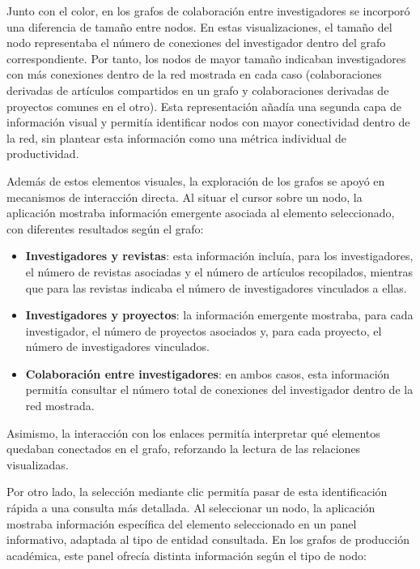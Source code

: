\documentclass[11pt,spanish,listoffigures,listoftables]{tfgetsinf}
\begin{document}
Junto con el color, en los grafos de colaboración entre investigadores se incorporó una diferencia de tamaño entre nodos. En estas visualizaciones, el tamaño del nodo representaba el número de conexiones del investigador dentro del grafo correspondiente. Por tanto, los nodos de mayor tamaño indicaban investigadores con más conexiones dentro de la red mostrada en cada caso (colaboraciones derivadas de artículos compartidos en un grafo y colaboraciones derivadas de proyectos comunes en el otro). Esta representación añadía una segunda capa de información visual y permitía identificar nodos con mayor conectividad dentro de la red, sin plantear esta información como una métrica individual de productividad.

Además de estos elementos visuales, la exploración de los grafos se apoyó en mecanismos de interacción directa. Al situar el cursor sobre un nodo, la aplicación mostraba información emergente asociada al elemento seleccionado, con diferentes resultados según el grafo: 
\begin{itemize}
    \item \textbf{Investigadores y revistas}: esta información incluía, para los investigadores, el número de revistas asociadas y el número de artículos recopilados, mientras que para las revistas indicaba el número de investigadores vinculados a ellas.

    \item \textbf{Investigadores y proyectos}: la información emergente mostraba, para cada investigador, el número de proyectos asociados y, para cada proyecto, el número de investigadores vinculados.

    \item \textbf{Colaboración entre investigadores}: en ambos casos, esta información permitía consultar el número total de conexiones del investigador dentro de la red mostrada.
\end{itemize}

Asimismo, la interacción con los enlaces permitía interpretar qué elementos quedaban conectados en el grafo, reforzando la lectura de las relaciones visualizadas.

Por otro lado, la selección mediante clic permitía pasar de esta identificación rápida a una consulta más detallada. Al seleccionar un nodo, la aplicación mostraba información específica del elemento seleccionado en un panel informativo, adaptada al tipo de entidad consultada. En los grafos de producción académica, este panel ofrecía distinta información según el tipo de nodo:
\end{document}
